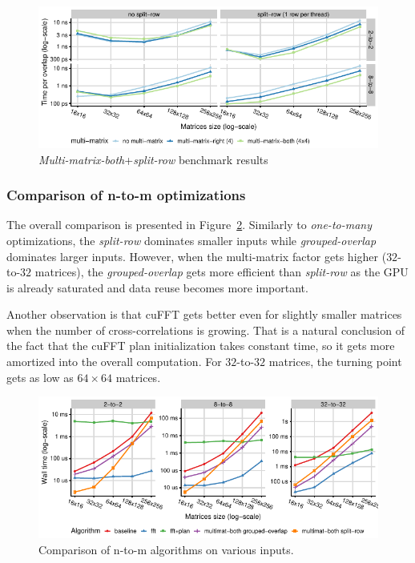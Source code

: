 \begin{figure}[ht]
	\centering
	\includegraphics{crosscorr/plots/n-to-m/multimat-both-split-row.pdf}
	\caption{\emph{Multi-matrix-both}+\emph{split-row} benchmark results}
	\label{fig:multimat-both-split-row}
\end{figure}

\subsubsection{Comparison of n-to-m optimizations}

The overall comparison is presented in Figure~\ref{fig:n-to-m}. Similarly to \emph{one-to-many} optimizations, the \emph{split-row} dominates smaller inputs while \emph{grouped-overlap} dominates larger inputs. However, when the multi-matrix factor gets higher ($32$-to-$32$ matrices), the \emph{grouped-overlap} gets more efficient than \emph{split-row} as the GPU is already saturated and data reuse becomes more important.

Another observation is that cuFFT gets better even for slightly smaller matrices when the number of cross-correlations is growing. That is a natural conclusion of the fact that the cuFFT plan initialization takes constant time, so it gets more amortized into the overall computation. For $32$-to-$32$ matrices, the turning point gets as low as $64\times 64$ matrices.

\begin{figure}[ht]
	\centering
	\includegraphics{crosscorr/plots/n-to-m/n-to-m.pdf}
	\caption{Comparison of n-to-m algorithms on various inputs.}
	\label{fig:n-to-m}
\end{figure}


